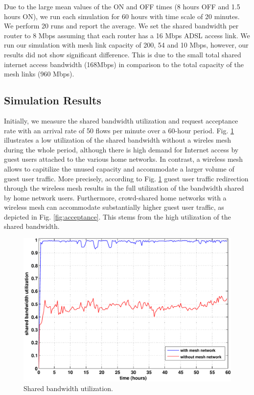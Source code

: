 Due to the large mean values of the ON and OFF times (8 hours OFF and 1.5 hours ON), we run each simulation for 60 hours with time scale of 20 minutes. We perform 20 runs and report the average. We set the shared bandwidth per router to 8 Mbps assuming that each router has a 16 Mbps ADSL access link. We run our simulation with mesh link capacity of 200, 54 and 10 Mbps, however, our results did not show significant difference. This is due to the small total shared internet access bandwidth (168Mbps) in comparison to the total capacity of the mesh links (960 Mbps).

\subsection{Simulation Results}
\label{evaluation:results}

Initially, we measure the shared bandwidth utilization and request acceptance rate with an arrival rate of 50 flows per minute over a 60-hour period. Fig. \ref{fig:utilization} illustrates a low utilization of the shared bandwidth without a wireles mesh during the whole period, although there is high demand for Internet access by guest users attached to the various home networks. In contrast, a wireless mesh allows to capitilize the unused capacity and accommodate a larger volume of guest user traffic. More precisely, according to Fig. \ref{fig:utilization} guest user traffic redirection through the wireless mesh results in the full utilization of the bandwidth shared by home network users. Furthermore, crowd-shared home networks with a wireless mesh can accommodate substantially higher guest user traffic, as depicted in Fig. \ref{fig:acceptance}. This stems from the high utilization of the shared bandwidth.

\begin{figure}[t]
\begin{center}
\includegraphics[width=1\linewidth]{results/utilization.pdf}
\caption{Shared bandwidth utilization.}
\label{fig:utilization}
\end{center}
\end{figure}

